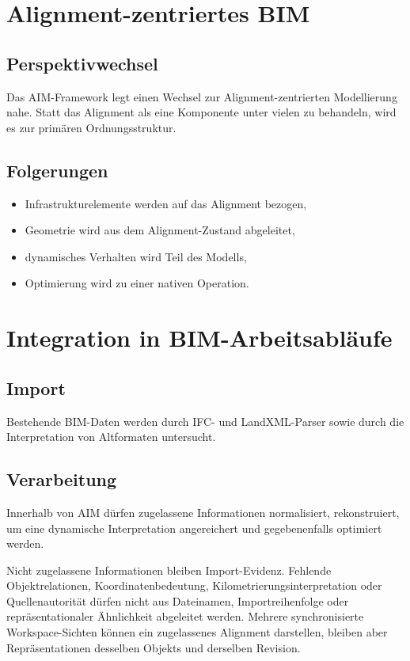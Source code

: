 \section{Alignment-zentriertes BIM}

\subsection{Perspektivwechsel}

Das AIM-Framework legt einen Wechsel zur Alignment-zentrierten
Modellierung nahe. Statt das Alignment als eine Komponente unter vielen
zu behandeln, wird es zur primären Ordnungsstruktur.

\subsection{Folgerungen}

\begin{itemize}
\item Infrastrukturelemente werden auf das Alignment bezogen,
\item Geometrie wird aus dem Alignment-Zustand abgeleitet,
\item dynamisches Verhalten wird Teil des Modells,
\item Optimierung wird zu einer nativen Operation.
\end{itemize}

\section{Integration in BIM-Arbeitsabläufe}

\subsection{Import}

Bestehende BIM-Daten werden durch IFC- und LandXML-Parser sowie durch die
Interpretation von Altformaten untersucht.

\subsection{Verarbeitung}

Innerhalb von AIM dürfen zugelassene Informationen normalisiert,
rekonstruiert, um eine dynamische Interpretation angereichert und
gegebenenfalls optimiert werden.

Nicht zugelassene Informationen bleiben Import-Evidenz. Fehlende
Objektrelationen, Koordinatenbedeutung, Kilometrierungsinterpretation oder
Quellenautorität dürfen nicht aus Dateinamen, Importreihenfolge oder
repräsentationaler Ähnlichkeit abgeleitet werden. Mehrere synchronisierte
Workspace-Sichten können ein zugelassenes Alignment darstellen, bleiben aber
Repräsentationen desselben Objekts und derselben Revision.

